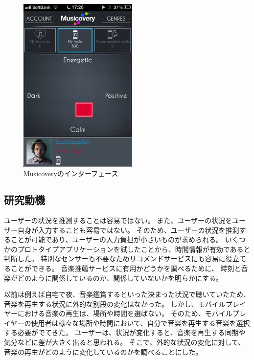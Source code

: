 \documentclass[11pt, twocolumn]{jsarticle}
\begin{document}
\begin{figure}[h]
\begin{center}
\includegraphics[width=5.866cm]{musicovery.png}
\caption{Musicoveryのインターフェース}
\label{musicovery_interface}
\end{center}
\end{figure}

\subsection{研究動機}
ユーザーの状況を推測することは容易ではない。
また、ユーザーの状況をユーザー自身が入力することも容易ではない。
そのため、ユーザーの状況を推測することが可能であり、ユーザーの入力負担が小さいものが求められる。
いくつかのプロトタイプアプリケーションを試したことから、時間情報が有効であると判断した。
特別なセンサーも不要なためリコメンドサービスにも容易に役立てることができる。
音楽推薦サービスに有用かどうかを調べるために、
時刻と音楽がどのように関係しているのか、関係していないかを明らかにする。

以前は例えば自宅で夜、音楽鑑賞するといった決まった状況で聴いていたため、
音楽を再生する状況に外的な別段の変化はなかった。
しかし、モバイルプレイヤーにおける音楽の再生は、場所や時間を選ばない。
そのため、モバイルプレイヤーの使用者は様々な場所や時間において、自分で音楽を再生する音楽を選択する必要がでてきた。
ユーザーは、状況が変化すると、音楽を再生する同期や気分などに差が大きく出ると思われる。
そこで、外的な状況の変化に対して、音楽の再生がどのように変化しているのかを調べることにした。
\end{document}
